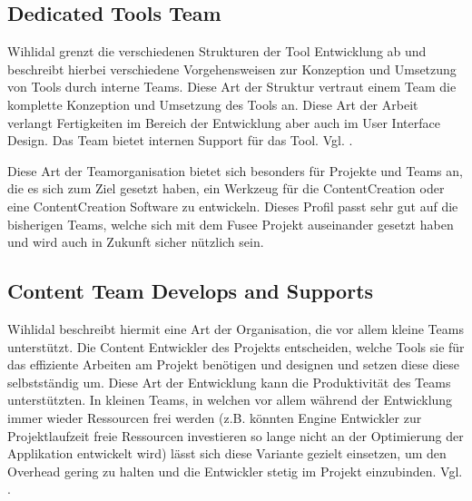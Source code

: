 \documentclass[pagesize, paper=a4, fontsize=12pt, titlepage=true, headings=small, headnosepline, abstractoff, liststotoc, nochapterprefix, plainheadsepline, twoside]{scrreprt}
\begin{document}
\subsection{Dedicated Tools Team}
Wihlidal grenzt die verschiedenen Strukturen der Tool Entwicklung ab und beschreibt hierbei verschiedene Vorgehensweisen zur Konzeption und Umsetzung von Tools durch interne Teams.
Diese Art der Struktur vertraut einem Team die komplette Konzeption und Umsetzung des Tools an. Diese Art der Arbeit verlangt Fertigkeiten im Bereich der Entwicklung aber auch im User Interface Design. Das Team bietet internen Support für das Tool. Vgl. \cite{Wihlidal2006}.

Diese Art der Teamorganisation bietet sich besonders für Projekte und Teams an, die es sich zum Ziel gesetzt haben, ein Werkzeug für die ContentCreation oder eine ContentCreation Software zu entwickeln. Dieses Profil passt sehr gut auf die bisherigen Teams, welche sich mit dem Fusee Projekt auseinander gesetzt haben und wird auch in Zukunft sicher nützlich sein.

\subsection{Content Team Develops and Supports}
Wihlidal beschreibt hiermit eine Art der Organisation, die vor allem kleine Teams unterstützt. Die Content Entwickler des Projekts entscheiden, welche Tools sie für das effiziente Arbeiten am Projekt benötigen und designen und setzen diese diese selbstständig um. Diese Art der Entwicklung kann die Produktivität des Teams unterstützten. In kleinen Teams, in welchen vor allem während der Entwicklung immer wieder Ressourcen frei werden (z.B. könnten Engine Entwickler zur Projektlaufzeit freie Ressourcen investieren so lange nicht an der Optimierung der Applikation entwickelt wird) lässt sich diese Variante gezielt einsetzen, um den Overhead gering zu halten und die Entwickler stetig im Projekt einzubinden. Vgl. \cite{Wihlidal2006}.
\end{document}
